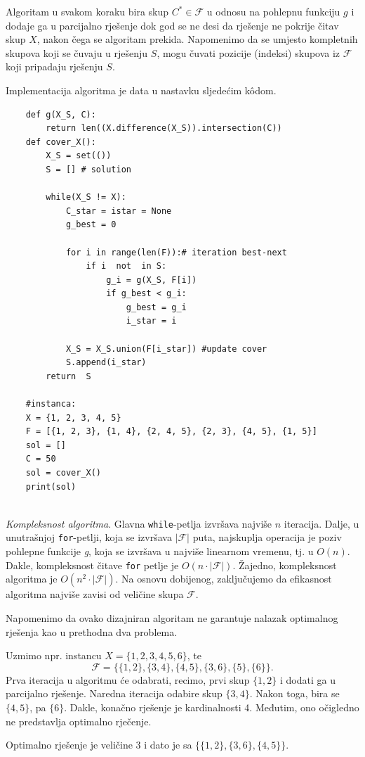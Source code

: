 \begin{solution}
Algoritam u svakom koraku bira skup $C^*\in \mathcal{F}$ u odnosu na pohle\-pnu funkciju $g$  i dodaje ga u parcijalno rješenje dok god se ne desi da rješenje ne pokrije čitav skup $X$, nakon čega se algoritam prekida. Napomenimo da se umjesto kompletnih skupova koji se čuvaju u rješenju $S$, mogu čuvati pozicije (indeksi) skupova iz $\mathcal{F}$ koji pripadaju rješenju $S$. 

Implementacija algoritma  je data u nastavku sljedećim k\^odom.

\begin{verbatim}
	def g(X_S, C):
		return len((X.difference(X_S)).intersection(C))
	def cover_X():
		X_S = set(())
		S = [] # solution
	
		while(X_S != X):
			C_star = istar = None
			g_best = 0
	
			for i in range(len(F)):# iteration best-next
				if i  not  in S: 
					g_i = g(X_S, F[i])
					if g_best < g_i:
						g_best = g_i
						i_star = i
	
			X_S = X_S.union(F[i_star]) #update cover
			S.append(i_star)
		return  S            
	
	#instanca: 
	X = {1, 2, 3, 4, 5}
	F = [{1, 2, 3}, {1, 4}, {2, 4, 5}, {2, 3}, {4, 5}, {1, 5}]
	sol = []
	C = 50
	sol = cover_X()
	print(sol)
	
\end{verbatim}

\textit{Kompleksnost algoritma}. Glavna \texttt{while}-petlja izvršava najviše $n$ iteracija. Dalje, u unutrašnjoj \texttt{for}-petlji, koja se izvršava  $ |\mathcal{F}|$ puta, najskuplja operacija je poziv pohlepne funkcije \textit{g}, koja se izvršava u   najviše linearnom vremenu, tj. u $O(n)$. Dakle, kompleksnost čitave \texttt{for} petlje je $O(n \cdot  |\mathcal{F} |)$. Žajedno, kompleksnost algoritma je $O(n^2 \cdot  |\mathcal{F} |)$. Na osnovu dobijenog, zaključujemo da efikasnost algoritma najviše zavisi od veličine skupa $\mathcal{F}$. 

Napomenimo da ovako dizajniran algoritam ne garantuje nalazak opti\-malnog rješenja  kao u prethodna dva problema. 


  Uzmimo npr. instancu $X= \{1, 2, 3, 4, 5, 6\}$, te $$\mathcal{F}= \{\{1,2\}, \{3, 4\}, \{4, 5\}, \{3, 6\}, \{5\}, \{6\} \}.$$   
  Prva iteracija u algoritmu će odabrati, recimo, prvi skup $\{1, 2\}$ i dodati ga u parcijalno rješenje. Naredna iteracija odabire skup $\{3, 4\}$. Nakon toga, bira se $\{4, 5\}$, pa $\{6\}$. Dakle, konačno rješenje je kardinalnosti 4. Međutim, ono očigledno ne predstavlja optimalno rječenje. 
  
  Optimalno rješenje je veličine 3 i dato je sa $\{ \{1, 2\}, \{3, 6\}, \{4,5\}\}$.  
	 
\end{solution}

